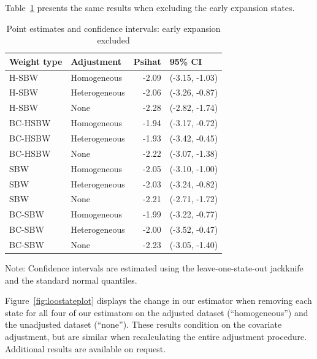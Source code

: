 Table~\ref{tab:confintmainc2} presents the same results when excluding the early expansion states.

\begin{table}[h!]
\centering
\begin{threeparttable}
\caption{Point estimates and confidence intervals: early expansion excluded}
\label{tab:confintmainc2}
\begin{tabular}{llrl}
  \hline
Weight type & Adjustment & Psihat & 95\% CI \\ 
  \hline
H-SBW & Homogeneous & -2.09 & (-3.15, -1.03) \\ 
  H-SBW & Heterogeneous & -2.06 & (-3.26, -0.87) \\ 
  H-SBW & None & -2.28 & (-2.82, -1.74) \\ 
  BC-HSBW & Homogeneous & -1.94 & (-3.17, -0.72) \\ 
  BC-HSBW & Heterogeneous & -1.93 & (-3.42, -0.45) \\ 
  BC-HSBW & None & -2.22 & (-3.07, -1.38) \\ 
  SBW & Homogeneous & -2.05 & (-3.10, -1.00) \\ 
  SBW & Heterogeneous & -2.03 & (-3.24, -0.82) \\ 
  SBW & None & -2.21 & (-2.71, -1.72) \\ 
  BC-SBW & Homogeneous & -1.99 & (-3.22, -0.77) \\ 
  BC-SBW & Heterogeneous & -2.00 & (-3.52, -0.47) \\ 
  BC-SBW & None & -2.23 & (-3.05, -1.40) \\ 
   \hline
\end{tabular}
    \begin{tablenotes}
      \item[] Note: Confidence intervals are estimated using the leave-one-state-out jackknife and the standard normal quantiles.
    \end{tablenotes}
\end{threeparttable}
\end{table}

Figure~\ref{fig:loostateplot} displays the change in our estimator when removing each state for all four of our estimators on the adjusted dataset (``homogeneous'') and the unadjusted dataset (``none''). These results condition on the covariate adjustment, but are similar when recalculating the entire adjustment procedure. Additional results are available on request.

